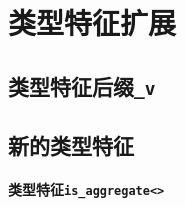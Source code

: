 \chapter{类型特征扩展}\label{ch21}

\section{类型特征后缀\texttt{\_v}}\label{ch21.1}

\section{新的类型特征}
\subsubsection{类型特征\texttt{is\_aggregate<>}}\label{ch21.2.1}